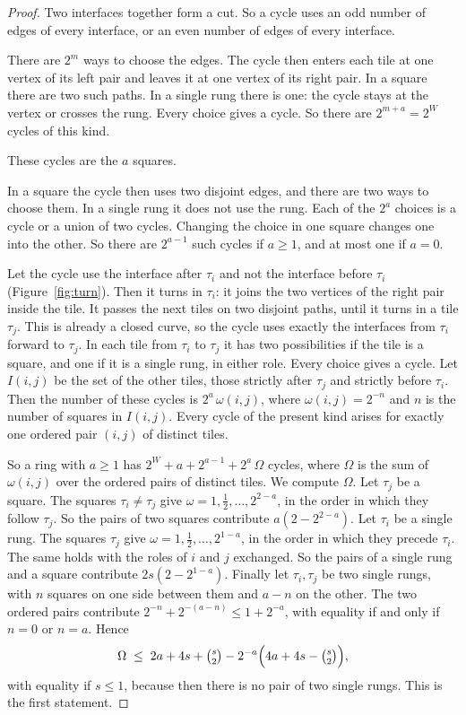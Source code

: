 \begin{proof}
Two interfaces together form a cut. So a cycle uses an odd number of edges of every interface, or
an even number of edges of every interface.

 There are $2^{m}$ ways to choose the edges. The cycle then
enters each tile at one vertex of its left pair and leaves it at one vertex of its right pair. In a
square there are two such paths. In a single rung there is one: the cycle stays at the vertex or
crosses the rung. Every choice gives a cycle. So there are $2^{m+a}=2^{W}$ cycles of this kind.

 These cycles are the $a$ squares.

 In a square the cycle then uses two disjoint edges, and there
are two ways to choose them. In a single rung it does not use the rung. Each of the $2^{a}$ choices
is a cycle or a union of two cycles. Changing the choice in one square changes one into the other.
So there are $2^{a-1}$ such cycles if $a\ge1$, and at most one if $a=0$.

 Let the cycle use the interface after
$\tau_i$ and not the interface before $\tau_i$ (Figure~\ref{fig:turn}). Then it turns in $\tau_i$: it joins the two
vertices of the right pair inside the tile. It passes the next tiles on two disjoint paths, until
it turns in a tile $\tau_j$. This is already a closed curve, so the cycle uses exactly the
interfaces from $\tau_i$ forward to $\tau_j$. In each tile from $\tau_i$ to $\tau_j$ it has two
possibilities if the tile is a square, and one if it is a single rung, in either role. Every
choice gives a cycle. Let $I(i,j)$ be the set of the other tiles, those strictly after $\tau_j$
and strictly before $\tau_i$. Then the number of these cycles is $2^{a}\,\omega(i,j)$, where
$\omega(i,j)=2^{-n}$ and $n$ is the number of squares in $I(i,j)$. Every cycle of the present kind
arises for exactly one ordered pair $(i,j)$ of distinct tiles.

So a ring with $a\ge1$ has $2^{W}+a+2^{a-1}+2^{a}\,\Omega$ cycles, where $\Omega$ is the sum of
$\omega(i,j)$ over the ordered pairs of distinct tiles. We compute $\Omega$. Let $\tau_j$ be a
square. The squares $\tau_i\ne\tau_j$ give $\omega=1,\frac12,\dots,2^{2-a}$, in the order in which
they follow $\tau_j$. So the pairs of two squares contribute $a(2-2^{2-a})$. Let $\tau_i$ be a
single rung. The squares $\tau_j$ give $\omega=1,\frac12,\dots,2^{1-a}$, in the order in which they
precede $\tau_i$. The same holds with the roles of $i$ and $j$ exchanged. So the pairs of a single
rung and a square contribute $2s(2-2^{1-a})$. Finally let $\tau_i,\tau_j$ be two single rungs, with
$n$ squares on one side between them and $a-n$ on the other. The two ordered pairs contribute
$2^{-n}+2^{-(a-n)}\le1+2^{-a}$, with equality if and only if $n=0$ or $n=a$. Hence
\[
  \Omega\;\le\;2a+4s+\tbinom s2-2^{-a}\Bigl(4a+4s-\tbinom s2\Bigr),
\]
with equality if $s\le1$, because then there is no pair of two single rungs. This is the first
statement.


\end{proof}
